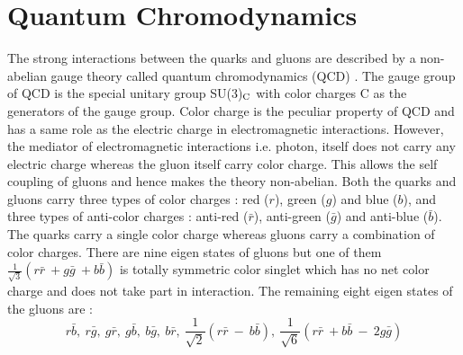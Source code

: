 \section{Quantum Chromodynamics}
The strong interactions between the quarks and gluons are described by a non-abelian gauge theory called quantum chromodynamics (QCD) \cite{Ellis:1991qj, Halzen:1984mc}. The gauge group of QCD is the special unitary group SU(3)$_{\rm C}$ with color charges C as the generators of the gauge group. Color charge is the peculiar property of QCD and has a same role as the electric charge in electromagnetic interactions. However, the mediator of electromagnetic interactions i.e. photon, itself does not carry any electric charge whereas the gluon itself carry color charge. This allows the self coupling of gluons and hence makes the theory non-abelian. Both the quarks and gluons carry three types of color charges : red ($r$), green ($g$) and blue ($b$), and three types of anti-color charges : anti-red ($\bar{r}$), anti-green ($\bar{g}$) and anti-blue ($\bar{b}$). The quarks carry a single color charge whereas gluons carry a combination of color charges. There are nine eigen states of gluons but one of them $\frac{1}{\sqrt{3}}(r\bar{r}~\plus g\bar{g}~\plus b\bar{b})$ is totally symmetric color singlet which has no net color charge and does not take part in interaction. The remaining eight eigen states of the gluons are :
\begin{equation}
r\bar{b},~r\bar{g},~g\bar{r},~g\bar{b},~b\bar{g},~b\bar{r},~\frac{1}{\sqrt{2}}(r\bar{r}~-~b\bar{b}),~\frac{1}{\sqrt{6}}(r\bar{r}~\plus b\bar{b}~-~2g\bar{g}) 
\end{equation}

